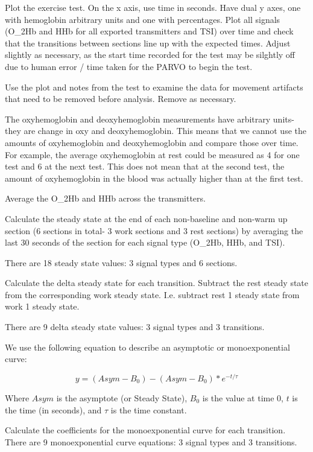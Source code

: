 \documentclass[
]{book}
\begin{document}
Plot the exercise test. On the x axis, use time in seconds. Have dual y axes, one with hemoglobin arbitrary units and one with percentages. Plot all signals (O\_2Hb and HHb for all exported transmitters and TSI) over time and check that the transitions between sections line up with the expected times. Adjust slightly as necessary, as the start time recorded for the test may be silghtly off due to human error / time taken for the PARVO to begin the test.

Use the plot and notes from the test to examine the data for movement artifacts that need to be removed before analysis. Remove as necessary.

The oxyhemoglobin and deoxyhemoglobin measurements have arbitrary units- they are change in oxy and deoxyhemoglobin. This means that we cannot use the amounts of oxyhemoglobin and deoxyhemoglobin and compare those over time. For example, the average oxyhemoglobin at rest could be measured as 4 for one test and 6 at the next test. This does not mean that at the second test, the amount of oxyhemoglobin in the blood was actually higher than at the first test.

Average the O\_2Hb and HHb across the transmitters.

Calculate the steady state at the end of each non-baseline and non-warm up section (6 sections in total- 3 work sections and 3 rest sections) by averaging the last 30 seconds of the section for each signal type (O\_2Hb, HHb, and TSI).

There are 18 steady state values: 3 signal types and 6 sections.

Calculate the delta steady state for each transition.
Subtract the rest steady state from the corresponding work steady state. I.e. subtract rest 1 steady state from work 1 steady state.

There are 9 delta steady state values: 3 signal types and 3 transitions.

We use the following equation to describe an asymptotic or monoexponential curve:

\[y =({Asym}-B_0) - ({Asym}-B_0)*e^{-t/ \tau} \]

Where \({Asym}\) is the asymptote (or Steady State), \(B_0\) is the value at time 0, \(t\) is the time (in seconds), and \(\tau\) is the time constant.

Calculate the coefficients for the monoexponential curve for each transition. There are 9 monoexponential curve equations: 3 signal types and 3 transitions.
\end{document}
